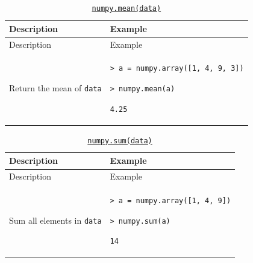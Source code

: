 \documentclass[10pt,a4paperpaper,]{article}
\begin{document}
\begin{longtable}[]{@{}ll@{}}
\caption{\href{http://docs.scipy.org/doc/numpy/reference/generated/numpy.mean.html}{\texttt{numpy.mean(data)}}}\tabularnewline
\toprule
\begin{minipage}[b]{0.47\columnwidth}\raggedright\strut
Description\strut
\end{minipage} & \begin{minipage}[b]{0.47\columnwidth}\raggedright\strut
Example\strut
\end{minipage}\tabularnewline
\midrule
\endfirsthead
\toprule
\begin{minipage}[b]{0.47\columnwidth}\raggedright\strut
Description\strut
\end{minipage} & \begin{minipage}[b]{0.47\columnwidth}\raggedright\strut
Example\strut
\end{minipage}\tabularnewline
\midrule
\endhead
\begin{minipage}[t]{0.47\columnwidth}\raggedright\strut
Return the mean of \texttt{data}\strut
\end{minipage} & \begin{minipage}[t]{0.47\columnwidth}\raggedright\strut
\texttt{\textgreater{}\ a\ =\ numpy.array({[}1,\ 4,\ 9,\ 3{]})}

\texttt{\textgreater{}\ numpy.mean(a)}

\texttt{4.25}\strut
\end{minipage}\tabularnewline
\bottomrule
\end{longtable}

\begin{longtable}[]{@{}ll@{}}
\caption{\href{http://docs.scipy.org/doc/numpy/reference/generated/numpy.sum.html}{\texttt{numpy.sum(data)}}}\tabularnewline
\toprule
\begin{minipage}[b]{0.47\columnwidth}\raggedright\strut
Description\strut
\end{minipage} & \begin{minipage}[b]{0.47\columnwidth}\raggedright\strut
Example\strut
\end{minipage}\tabularnewline
\midrule
\endfirsthead
\toprule
\begin{minipage}[b]{0.47\columnwidth}\raggedright\strut
Description\strut
\end{minipage} & \begin{minipage}[b]{0.47\columnwidth}\raggedright\strut
Example\strut
\end{minipage}\tabularnewline
\midrule
\endhead
\begin{minipage}[t]{0.47\columnwidth}\raggedright\strut
Sum all elements in \texttt{data}\strut
\end{minipage} & \begin{minipage}[t]{0.47\columnwidth}\raggedright\strut
\texttt{\textgreater{}\ a\ =\ numpy.array({[}1,\ 4,\ 9{]})}

\texttt{\textgreater{}\ numpy.sum(a)}

\texttt{14}\strut
\end{minipage}\tabularnewline
\bottomrule
\end{longtable}
\end{document}
